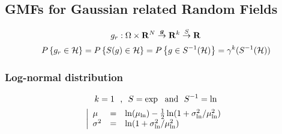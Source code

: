 \documentclass[12pt]{article}
\begin{document}
\subsection{GMFs for Gaussian related Random Fields}
\begin{equation}
  g_r : \Omega\times\mathbf{R}^N \overset{\boldsymbol{g}}{\rightarrow} \mathbf{R}^k \overset{S}{\rightarrow} \mathbf{R}
\end{equation}
\begin{equation}
    P\left\{g_r\in\mathcal{H}\right\} = P\left\{S(g)\in\mathcal{H}\right\} = P\left\{g\in S^{-1}(\mathcal{H})\right\} = \gamma^k(S^{-1}(\mathcal{H}))
\end{equation}

\subsubsection{Log-normal distribution}
\begin{equation}
  k=1 \ \ \text{,} \ \ \rfunc=\exp \ \ \text{and} \ \ \irfunc=\ln
\end{equation}
\begin{equation}
  \left|
  \begin{array}{lcl}
    \mu & = &\ln(\mu_{\ln}) - \frac{1}{2}\ln(1+\sigma_{\ln}^2/\mu_{\ln}^2) \\
    \sigma^2 & = & \ln(1+\sigma_{\ln}^2/\mu_{\ln}^2)
  \end{array}
  \right.
\end{equation}
\end{document}
